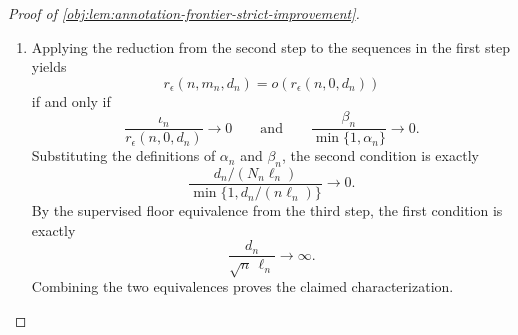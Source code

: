 \begin{proof}[Proof of \cref{obj:lem:annotation-frontier-strict-improvement}]
\begin{enumerate}
\item
Applying the reduction from the second step to the sequences in the first step yields
\[
r_\epsilon(n,m_n,d_n)=o\!\left(r_\epsilon(n,0,d_n)\right)
\]
if and only if
\[
\frac{\iota_n}{r_\epsilon(n,0,d_n)}\to0
\qquad\text{and}\qquad
\frac{\beta_n}{\min\{1,\alpha_n\}}\to0.
\]
Substituting the definitions of \(\alpha_n\) and \(\beta_n\), the second condition is exactly
\[
\frac{d_n/(N_n\ell_n)}
{\min\{1,d_n/(n\ell_n)\}}
\to0.
\]
By the supervised floor equivalence from the third step, the first condition is exactly
\[
\frac{d_n}{\sqrt n\,\ell_n}\to\infty.
\]
Combining the two equivalences proves the claimed characterization.
\end{enumerate}
\end{proof}
